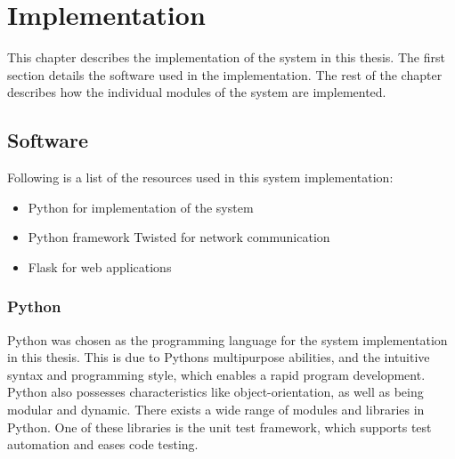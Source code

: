 \chapter{Implementation}
This chapter describes the implementation of the system in this thesis. The first section details the software used in the implementation. The rest of the chapter describes how the individual modules of the system are implemented.


\section{Software}
Following is a list of the resources used in this system implementation:
\begin{itemize}
\item Python for implementation of the system
\item Python framework Twisted for network communication
\item Flask for web applications
\end{itemize}

\subsection{Python}
Python \cite{python} was chosen as the programming language for the system implementation in this thesis. This is due to Pythons multipurpose abilities, and the intuitive syntax and programming style, which enables a rapid program development. Python also possesses characteristics like object-orientation, as well as being modular and dynamic. There exists a wide range of modules and libraries in Python. One of these libraries is the unit test framework, which supports test automation and eases code testing.

